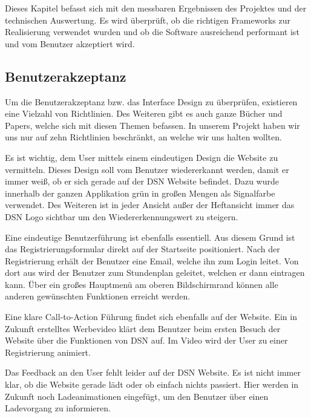 Dieses Kapitel befasst sich mit den messbaren Ergebnissen des Projektes und der technischen Auswertung. Es wird überprüft, ob die richtigen Frameworks zur Realisierung verwendet wurden und ob die Software ausreichend performant ist und vom Benutzer akzeptiert wird.

\subsection{Benutzerakzeptanz}
Um die Benutzerakzeptanz bzw. das Interface Design zu überprüfen, existieren eine Vielzahl von Richtlinien. Des Weiteren gibt es auch ganze Bücher und Papers, welche sich mit diesen Themen befassen. In unserem Projekt haben wir uns nur auf zehn Richtlinien\cite{INTDES1} beschränkt, an welche wir uns halten wollten. 

Es ist wichtig, dem User mittels einem eindeutigen Design die Website zu vermitteln. Dieses Design soll vom Benutzer wiedererkannt werden, damit er immer weiß, ob er sich gerade auf der DSN Website befindet. Dazu wurde innerhalb der ganzen Applikation grün in großen Mengen als Signalfarbe verwendet. Des Weiteren ist in jeder Ansicht außer der Heftansicht immer das DSN Logo sichtbar um den Wiedererkennungswert zu steigern.

Eine eindeutige Benutzerführung ist ebenfalls essentiell. Aus diesem Grund ist das Registrierungsformular direkt auf der Startseite positioniert. Nach der Registrierung erhält der Benutzer eine Email, welche ihn zum Login leitet. Von dort aus wird der Benutzer zum Stundenplan geleitet, welchen er dann eintragen kann. Über ein großes Hauptmenü am oberen Bildschirmrand können alle anderen gewünschten Funktionen erreicht werden.

Eine klare Call-to-Action Führung findet sich ebenfalls auf der Website. Ein in Zukunft erstelltes Werbevideo klärt dem Benutzer beim ersten Besuch der Website über die Funktionen von DSN auf. Im Video wird der User zu einer Registrierung animiert.

Das Feedback an den User fehlt leider auf der DSN Website. Es ist nicht immer klar, ob die Website gerade lädt oder ob einfach nichts passiert. Hier werden in Zukunft noch Ladeanimationen eingefügt, um den Benutzer über einen Ladevorgang zu informieren.

